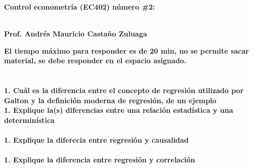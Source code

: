 \documentclass[letterpaper,12pt,final,titlepage]{article}
\begin{document}
\begin{center}
\begin{large}
\textbf{Control econometría (EC402) número \#2:}
\end{large}\\
\textbf{Prof. Andrés Mauricio Castaño Zuluaga}
\end{center}
\textbf{El tiempo máximo para responder es de 20 min, no se permite sacar material, se debe responder en el espacio asignado.}\\
\\
\\
\textbf{1. Cuál es la diferencia entre el concepto de regresión utilizado por Galton y la definición moderna de regresión, de un ejemplo}
\\
\/
\textbf{1. Explique la(s) diferencias entre una relación estadística y una determinística}
\\
\\
\textbf{1. Explique la diferecia entre regresión y causalidad}
\\
\\
\textbf{1. Explique la diferencia entre regresión y correlación}
\end{document}
